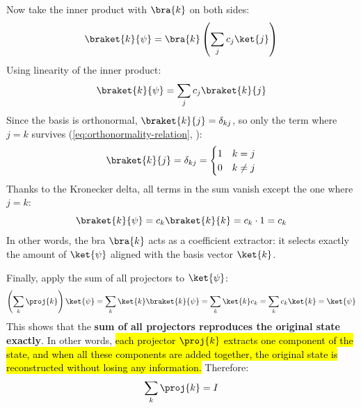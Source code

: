 \highspace
Now take the inner product with $\bra{k}$ on both sides:
\begin{equation*}
    \braket{k}{\psi}
    =
    \bra{k}
    \left(
        \sum_j c_j \ket{j}
    \right)
\end{equation*}
Using linearity of the inner product:
\begin{equation*}
    \braket{k}{\psi}
    =
    \sum_j c_j \braket{k}{j}
\end{equation*}
Since the basis is orthonormal, $\braket{k}{j} = \delta_{kj}$, so only the term where $j = k$ survives (\autoref{eq:orthonormality-relation}, ):
\begin{equation*}
    \braket{k}{j}
    =
    \delta_{kj}
    =
    \begin{cases}
        1 & k = j \\
        0 & k \neq j
    \end{cases}
\end{equation*}
Thanks to the Kronecker delta, all terms in the sum vanish except the one where $j = k$:
\begin{equation*}
    \braket{k}{\psi}
    =
    c_k \braket{k}{k}
    =
    c_k \cdot 1
    =
    c_k
\end{equation*}
In other words, the bra $\bra{k}$ acts as a coefficient extractor: it selects exactly the amount of $\ket{\psi}$ aligned with the basis vector $\ket{k}$.

\highspace
Finally, apply the sum of all projectors to $\ket{\psi}$:
\begin{equation*}
    \left(\sum_k \proj{k}\right)\ket{\psi}
    =
    \sum_k \ket{k}\braket{k}{\psi}
    =
    \sum_k \ket{k} c_k
    =
    \sum_k c_k \ket{k}
    =
    \ket{\psi}
\end{equation*}
This shows that the \textbf{sum of all projectors reproduces the original state exactly}. In other words, \hl{each projector $\proj{k}$ extracts one component of the state, and when all these components are added together, the original state is reconstructed without losing any information.} Therefore:
\begin{equation*}
    \sum_k \proj{k} = I
\end{equation*}

